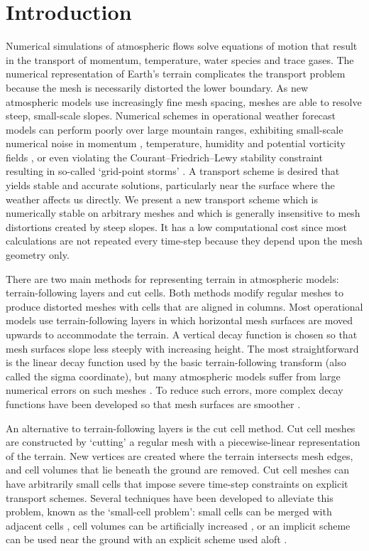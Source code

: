 \section{Introduction}

Numerical simulations of atmospheric flows solve equations of motion that result in the transport of momentum, temperature, water species and trace gases.  The numerical representation of Earth's terrain complicates the transport problem because the mesh is necessarily distorted  the lower boundary.
As new atmospheric models use increasingly fine mesh spacing, meshes are able to resolve steep, small-scale slopes.  Numerical schemes in operational weather forecast models can perform poorly over large mountain ranges, exhibiting small-scale numerical noise in momentum \citep{walko-avissar2008b}, temperature, humidity \citep{schaer2002} and potential vorticity fields \citep{hoinka-zaengl2004}, or even violating the Courant--Friedrich--Lewy stability constraint resulting in so-called `grid-point storms' \citep{webster2003}.
A transport scheme is desired that yields stable and accurate solutions, particularly near the surface where the weather affects us directly.
We present a new transport scheme which is numerically stable on arbitrary meshes and which is generally insensitive to mesh distortions created by steep slopes.  It has a low computational cost since most calculations are not repeated every time-step because they depend upon the mesh geometry only.

There are two main methods for representing terrain in atmospheric models: terrain-following layers and cut cells.
Both methods modify regular meshes to produce distorted meshes with cells that are aligned in columns.  Most operational models use terrain-following layers in which horizontal mesh surfaces are moved upwards to accommodate the terrain.  A vertical decay function is chosen so that mesh surfaces slope less steeply with increasing height.
The most straightforward is the linear decay function used by the basic terrain-following transform \citep{galchen-somerville1975} (also called the sigma coordinate), but many atmospheric models suffer from large numerical errors on such meshes \citep{schaer2002,klemp2011,eckermann2014}.
To reduce such errors, more complex decay functions have been developed so that mesh surfaces are smoother \citep{simmons-burridge1981,schaer2002,leuenberger2010,klemp2011}.

An alternative to terrain-following layers is the cut cell method.  Cut cell meshes are constructed by `cutting' a regular mesh with a piecewise-linear representation of the terrain.  New vertices are created where the terrain intersects mesh edges, and cell volumes that lie beneath the ground are removed.  Cut cell meshes can have arbitrarily small cells that impose severe time-step constraints on explicit transport schemes.  Several techniques have been developed to alleviate this problem, known as the `small-cell problem': small cells can be merged with adjacent cells \citep{yamazaki2016}, cell volumes can be artificially increased \citep{steppeler2002}, or an implicit scheme can be used near the ground with an explicit scheme used aloft \citep{jebens2011}.

